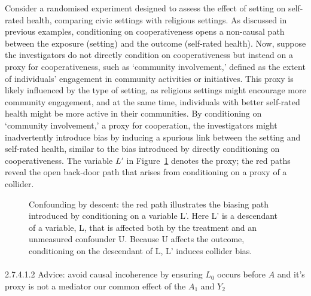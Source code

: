 \documentclass[
  singlecolumn]{article}
\makeatletter
\let\oldparagraph\paragraph
\renewcommand{\paragraph}{
    \@ifstar
      \xxxParagraphStar
      \xxxParagraphNoStar
  }
\newcommand{\xxxParagraphStar}[1]{\oldparagraph*{#1}\mbox{}}
\newcommand{\xxxParagraphNoStar}[1]{\oldparagraph{#1}\mbox{}}
\makeatother
\begin{document}
Consider a randomised experiment designed to assess the effect of
setting on self-rated health, comparing civic settings with religious
settings. As discussed in previous examples, conditioning on
cooperativeness opens a non-causal path between the exposure (setting)
and the outcome (self-rated health). Now, suppose the investigators do
not directly condition on cooperativeness but instead on a proxy for
cooperativeness, such as `community involvement,' defined as the extent
of individuals' engagement in community activities or initiatives. This
proxy is likely influenced by the type of setting, as religious settings
might encourage more community engagement, and at the same time,
individuals with better self-rated health might be more active in their
communities. By conditioning on `community involvement,' a proxy for
cooperation, the investigators might inadvertently introduce bias by
inducing a spurious link between the setting and self-rated health,
similar to the bias introduced by directly conditioning on
cooperativeness. The variable \(L'\) in
Figure~\ref{fig-dag-descendant-proxy} denotes the proxy; the red paths
reveal the open back-door path that arises from conditioning on a proxy
of a collider.

\begin{figure}


\caption{\label{fig-dag-descendant-proxy}Confounding by descent: the red
path illustrates the biasing path introduced by conditioning on a
variable L'. Here L' is a descendant of a variable, L, that is affected
both by the treatment and an unmeasured confounder U. Because U affects
the outcome, conditioning on the descendant of L, L' induces collider
bias.}

\end{figure}%

\paragraph{\texorpdfstring{2.7.4.1.2 Advice: avoid causal incoherence by
ensuring \(L_0\) occurs before \(A\) and it's proxy is not a mediator
our common effect of the \(A_1\) and
\(Y_2\)}{2.7.4.1.2 Advice: avoid causal incoherence by ensuring L\_0 occurs before A and it's proxy is not a mediator our common effect of the A\_1 and Y\_2}}\label{advice-avoid-causal-incoherence-by-ensuring-l_0-occurs-before-a-and-its-proxy-is-not-a-mediator-our-common-effect-of-the-a_1-and-y_2}
\end{document}
